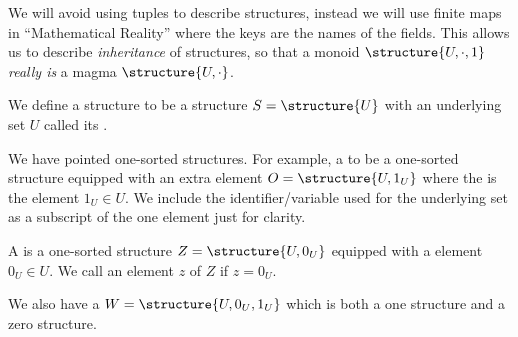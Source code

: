 \begin{remark}
We will avoid using tuples to describe structures, instead we will use
finite maps in ``Mathematical Reality'' where the keys are the names
of the fields. This allows us to describe \emph{inheritance} of
structures, so that a monoid $\structure{U,\cdot,1}$ \emph{really is}
a magma $\structure{U,\cdot}$.
\end{remark}

\begin{definition}
We define a  structure to be a structure
$S=\structure{U}$ with an underlying set $U$ called its .

We have pointed one-sorted structures. For example, a 
to be a one-sorted structure equipped with an extra element
$O=\structure{U,1_{U}}$ where the  is the element $1_{U}\in U$.
We include the identifier/variable used for the underlying set as a
subscript of the one element just for clarity.

A  is a one-sorted structure
$Z=\structure{U,0_{U}}$ equipped with a  element $0_{U}\in U$.
We call an element $z$ of $Z$  if $z=0_{U}$.

We also have a  $W=\structure{U,0_{U},1_{U}}$ which
is both a one structure and a zero structure.
\end{definition}


